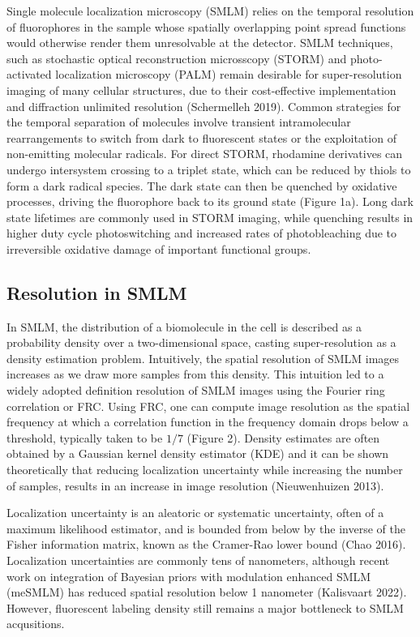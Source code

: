 \documentclass{ucetd}
\begin{document}
Single molecule localization microscopy (SMLM) relies on the temporal resolution of fluorophores in the sample whose spatially overlapping point spread functions would otherwise render them unresolvable at the detector. SMLM techniques, such as stochastic optical reconstruction microsscopy (STORM) and photo-activated localization microscopy (PALM) remain desirable for super-resolution imaging of many cellular structures, due to their cost-effective implementation and diffraction unlimited resolution (Schermelleh 2019). Common strategies for the temporal separation of molecules involve transient intramolecular rearrangements to switch from dark to fluorescent states or the exploitation of non-emitting molecular radicals. For direct STORM, rhodamine derivatives can undergo intersystem crossing to a triplet state, which can be reduced by thiols to form a dark radical species. The dark state can then be quenched by oxidative processes, driving the fluorophore back to its ground state (Figure 1a). Long dark state lifetimes are commonly used in STORM imaging, while quenching results in higher duty cycle photoswitching and increased rates of photobleaching due to irreversible oxidative damage of important functional groups.

\subsection{Resolution in SMLM}


In SMLM, the distribution of a biomolecule in the cell is described as a probability density over a two-dimensional space, casting super-resolution as a density estimation problem. Intuitively, the spatial resolution of SMLM images increases as we draw more samples from this density. This intuition led to a widely adopted definition resolution of SMLM images using the Fourier ring correlation or FRC. Using FRC, one can compute image resolution as the spatial frequency at which a correlation function in the frequency domain drops below a threshold, typically taken to be $1/7$ (Figure 2). Density estimates are often obtained by a Gaussian kernel density estimator (KDE) and it can be shown theoretically that reducing localization uncertainty while increasing the number of samples, results in an increase in image resolution (Nieuwenhuizen 2013).

Localization uncertainty is an aleatoric or systematic uncertainty, often of a maximum likelihood estimator, and is bounded from below by the inverse of the Fisher information matrix, known as the Cramer-Rao lower bound (Chao 2016). Localization uncertainties are commonly tens of nanometers, although recent work on integration of Bayesian priors with modulation enhanced SMLM (meSMLM) has reduced spatial resolution below 1 nanometer (Kalisvaart 2022). However, fluorescent labeling density still remains a major bottleneck to SMLM acqusitions. 
\end{document}

